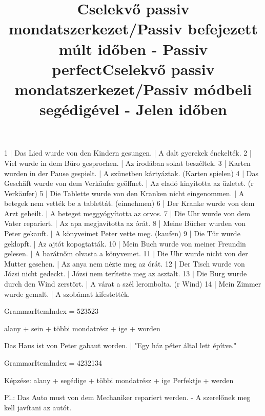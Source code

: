 \begin{exmp}
1 | Das Lied wurde von den Kindern gesungen. | A dalt gyerekek énekelték.
2 | Viel wurde in dem Büro gesprochen. | Az irodában sokat beszéltek.
3 | Karten wurden in der Pause gespielt. | A szünetben kártyáztak. (Karten spielen)
4 | Das Geschäft wurde von dem Verkäufer geöffnet. | Az eladó kinyitotta az üzletet. (r Verkäufer)
5 | Die Tablette wurde von den Kranken nicht eingenommen. | A betegek nem vették be a tablettát. (einnehmen)
6 | Der Kranke wurde von dem Arzt geheilt. | A beteget meggyógyította az orvos.
7 | Die Uhr wurde von dem Vater repariert. | Az apa megjavította az órát.
8 | Meine Bücher wurden von Peter gekauft. | A könyveimet Peter vette meg. (kaufen)
9 | Die Tür wurde geklopft. | Az ajtót kopogtatták.
10 | Mein Buch wurde von meiner Freundin gelesen. | A barátnőm olvasta a könyvemet.
11 | Die Uhr wurde nicht von der Mutter gesehen. | Az anya nem nézte meg az órát.
12 | Der Tisch wurde von Józsi nicht gedeckt. | Józsi nem terítette meg az asztalt.
13 | Die Burg wurde durch den Wind zerstört. | A várat a szél lerombolta. (r Wind)
14 | Mein Zimmer wurde gemalt. | A szobámat kifestették.
\end{exmp}

\title{Cselekvő passiv mondatszerkezet/Passiv befejezett múlt időben - Passiv perfect}

GrammarItemIndex = 523523

\begin{desc}
alany + sein + többi mondatrész + ige + worden

Das Haus ist von Peter gabaut worden. | "Egy ház péter által lett építve."
\end{desc}

\begin{exmp}
\end{exmp}

\title{Cselekvő passiv mondatszerkezet/Passiv módbeli segédigével - Jelen időben}

GrammarItemIndex = 4232134

\begin{desc}
Képzése:
alany + segédige + többi mondatrész + ige Perfektje + werden

Pl.: Das Auto must von dem Mechaniker repariert werden. - A szerelőnek meg kell javítani az autót.
\end{desc}

